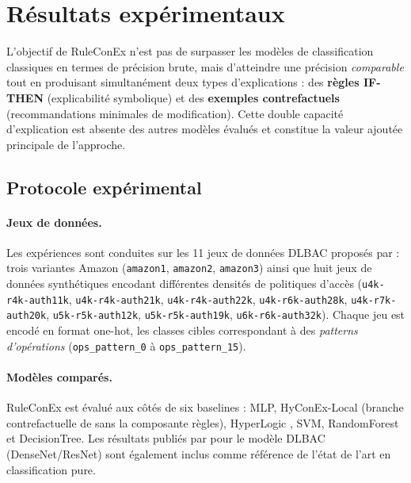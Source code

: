 \documentclass[12pt,a4paper]{article}
\begin{document}
\section{Résultats expérimentaux}
\label{sec:resultats}

L'objectif de RuleConEx n'est pas de surpasser les modèles de classification
classiques en termes de précision brute, mais d'atteindre une précision
\emph{comparable} tout en produisant simultanément deux types d'explications :
des \textbf{règles IF-THEN} (explicabilité symbolique) et des \textbf{exemples
contrefactuels} (recommandations minimales de modification).
Cette double capacité d'explication est absente des autres modèles évalués et
constitue la valeur ajoutée principale de l'approche.

\subsection{Protocole expérimental}
\label{sec:protocole}

\paragraph{Jeux de données.}
Les expériences sont conduites sur les 11 jeux de données DLBAC proposés par
\citet{nobi2022dlbac} : trois variantes Amazon (\texttt{amazon1},
\texttt{amazon2}, \texttt{amazon3}) ainsi que huit jeux de données synthétiques
encodant différentes densités de politiques d'accès
(\texttt{u4k-r4k-auth11k}, \texttt{u4k-r4k-auth21k}, \texttt{u4k-r4k-auth22k},
\texttt{u4k-r6k-auth28k}, \texttt{u4k-r7k-auth20k}, \texttt{u5k-r5k-auth12k},
\texttt{u5k-r5k-auth19k}, \texttt{u6k-r6k-auth32k}).
Chaque jeu est encodé en format one-hot, les classes cibles correspondant à des
\emph{patterns d'opérations} (\texttt{ops\_pattern\_0} à \texttt{ops\_pattern\_15}).

\paragraph{Modèles comparés.}
RuleConEx est évalué aux côtés de six baselines : MLP, HyConEx-Local
(branche contrefactuelle de \citealt{marszalek2026hyconex} sans la composante
règles), HyperLogic \citep{yang2024hyperlogic}, SVM, RandomForest et
DecisionTree. Les résultats publiés par \citet{nobi2022dlbac} pour le modèle
DLBAC (DenseNet/ResNet) sont également inclus comme référence de l'état
de l'art en classification pure.
\end{document}
